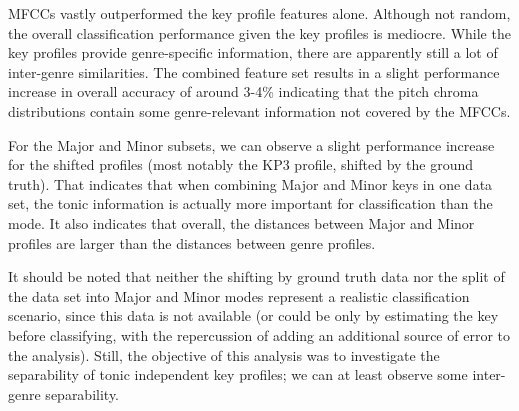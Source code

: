 \documentclass{article}
\begin{document}
MFCCs vastly outperformed the key profile features alone. Although not random, the overall classification performance given the key profiles is mediocre. While the key profiles provide genre-specific information, there are apparently still a lot of inter-genre similarities. The combined feature set results in a slight performance increase in overall accuracy of around 3-4\% indicating that the pitch chroma distributions contain some genre-relevant information not covered by the MFCCs. 

For the Major and Minor subsets, we can observe a slight performance increase for the shifted profiles (most notably the KP3 profile, shifted by the ground truth). That indicates that when combining Major and Minor keys in one data set, the tonic information is actually more important for classification than the mode. It also indicates that overall, the distances between Major and Minor profiles are larger than the distances between genre profiles. 

It should be noted that neither the shifting by ground truth data nor the split of the data set into Major and Minor modes represent a realistic classification scenario, since this data is not available (or could be only by estimating the key before classifying, with the repercussion of adding an additional source of error to the analysis). 
Still, the objective of this analysis was to investigate the separability of tonic independent key profiles; we can at least observe some inter-genre separability.



\end{document}
